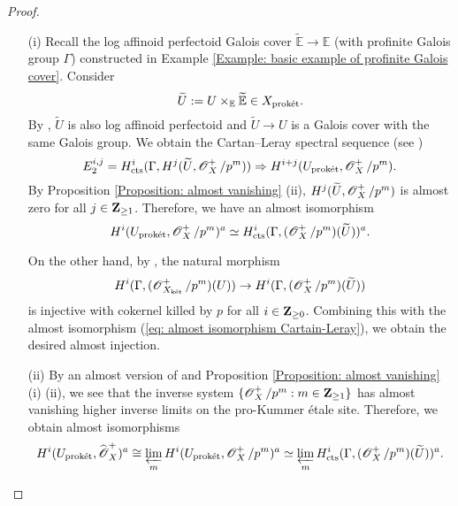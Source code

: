 \begin{proof}
\begin{enumerate}
\item[(i)] Recall the log affinoid perfectoid Galois cover $\widetilde{\mathbb{E}}\rightarrow \mathbb{E}$ (with profinite Galois group $\Gamma$) constructed in Example \ref{Example: basic example of profinite Galois cover}. Consider \[\widetilde{U}:=U\times_{\mathbb{E}}\widetilde{\mathbb{E}}\in X_{\operatorname{\textrm{prok\'{e}t}}}.\]
By \cite[Lemma 5.3.8]{Diao}, $\widetilde{U}$ is also log affinoid perfectoid and $\widetilde{U}\rightarrow U$ is a Galois cover with the same Galois group. We obtain the Cartan--Leray spectral sequence (see \cite[Remark 2.25]{CHJ-2017}) \[E_2^{i,j}= H_{\operatorname{cts}}^i(\Gamma, H^j(\widetilde{U}, \operatorname{\mathscr{O}}_{X}^+/p^m))\Rightarrow H^{i+j}(U_{\operatorname{\textrm{prok\'{e}t}}}, \operatorname{\mathscr{O}}_{X}^+/p^m).\] By Proposition \ref{Proposition: almost vanishing} (ii), $H^j(\widetilde{U}, \operatorname{\mathscr{O}}_{X}^+/p^m)$ is almost zero for all $j\in \operatorname{\mathbf{Z}}_{\geq 1}$. Therefore, we have an almost isomorphism 
\begin{equation}\label{eq: almost isomorphism Cartain-Leray}
H^i(U_{\operatorname{\textrm{prok\'{e}t}}}, \operatorname{\mathscr{O}}_{X}^+/p^m)^a\simeq H_{\operatorname{cts}}^i(\Gamma, (\operatorname{\mathscr{O}}_{X}^+/p^m)(\widetilde{U}))^a.
\end{equation}

On the other hand, by \cite[Lemma 6.1.7, Remark 6.1.8]{Diao}, the natural morphism 
\[H^i(\Gamma, (\operatorname{\mathscr{O}}_{X_{\operatorname{\textrm{k\'{e}t}}}}^+/p^m)(U))\rightarrow H^i(\Gamma, (\operatorname{\mathscr{O}}_{X}^+/p^m)(\widetilde{U}))\]
is injective with cokernel killed by $p$ for all $i\in \operatorname{\mathbf{Z}}_{\geq 0}$. Combining this with the almost isomorphism (\ref{eq: almost isomorphism Cartain-Leray}), we obtain the desired almost injection.

\item[(ii)] By an almost version of \cite[Lemma 3.18]{Scholze_2013} and Proposition \ref{Proposition: almost vanishing} (i) (ii), we see that the inverse system $\{\operatorname{\mathscr{O}}_{X}^+/p^m: m\in \operatorname{\mathbf{Z}}_{\geq 1}\}$ has almost vanishing higher inverse limits on the pro-Kummer \'{e}tale site. Therefore, we obtain almost isomorphisms
\[H^i(U_{\operatorname{\textrm{prok\'{e}t}}}, \widehat{\operatorname{\mathscr{O}}}_{X}^+)^a\cong \varprojlim_m H^i(U_{\operatorname{\textrm{prok\'{e}t}}}, \operatorname{\mathscr{O}}_{X}^+/p^m)^a \simeq \varprojlim_m H_{\operatorname{cts}}^i(\Gamma, (\operatorname{\mathscr{O}}_{X}^+/p^m)(\widetilde{U}))^a.\]


\end{enumerate}
\end{proof}
